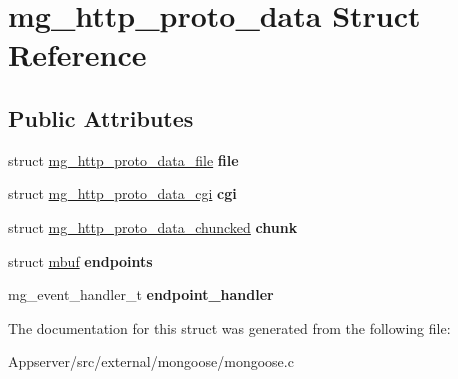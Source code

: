 \hypertarget{structmg__http__proto__data}{}\section{mg\+\_\+http\+\_\+proto\+\_\+data Struct Reference}
\label{structmg__http__proto__data}
\subsection*{Public Attributes}
\begin{DoxyCompactItemize}
\item 
struct \hyperlink{structmg__http__proto__data__file}{mg\+\_\+http\+\_\+proto\+\_\+data\+\_\+file} {\bfseries file}\hypertarget{structmg__http__proto__data_ae20ca04d2de50a9a7a0fe67fe8690b7b}{}\label{structmg__http__proto__data_ae20ca04d2de50a9a7a0fe67fe8690b7b}

\item 
struct \hyperlink{structmg__http__proto__data__cgi}{mg\+\_\+http\+\_\+proto\+\_\+data\+\_\+cgi} {\bfseries cgi}\hypertarget{structmg__http__proto__data_ab2fc099dda7919f3e4e5cd6c11e6da03}{}\label{structmg__http__proto__data_ab2fc099dda7919f3e4e5cd6c11e6da03}

\item 
struct \hyperlink{structmg__http__proto__data__chuncked}{mg\+\_\+http\+\_\+proto\+\_\+data\+\_\+chuncked} {\bfseries chunk}\hypertarget{structmg__http__proto__data_a36b052a8e6827001e15dd3e6aa38cbc9}{}\label{structmg__http__proto__data_a36b052a8e6827001e15dd3e6aa38cbc9}

\item 
struct \hyperlink{structmbuf}{mbuf} {\bfseries endpoints}\hypertarget{structmg__http__proto__data_ab9455af30858db881155bd0266944354}{}\label{structmg__http__proto__data_ab9455af30858db881155bd0266944354}

\item 
mg\+\_\+event\+\_\+handler\+\_\+t {\bfseries endpoint\+\_\+handler}\hypertarget{structmg__http__proto__data_ad117a16e518b9752e3f2b9ab6dacc0e3}{}\label{structmg__http__proto__data_ad117a16e518b9752e3f2b9ab6dacc0e3}

\end{DoxyCompactItemize}


The documentation for this struct was generated from the following file\+:\begin{DoxyCompactItemize}
\item 
Appserver/src/external/mongoose/mongoose.\+c\end{DoxyCompactItemize}
